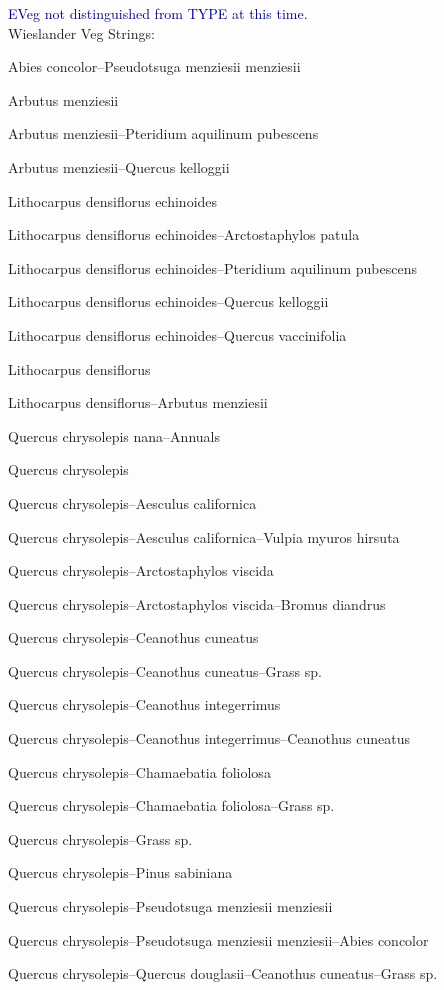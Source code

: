 \documentclass{article}
\newcommand{\mcomment}[1]{\textcolor{navy}{#1}}
\begin{document}
\mcomment{EVeg not distinguished from TYPE at this time.}\\
Wieslander Veg Strings:
\par	Abies concolor--Pseudotsuga menziesii menziesii
\par	Arbutus menziesii
\par	Arbutus menziesii--Pteridium aquilinum pubescens
\par	Arbutus menziesii--Quercus kelloggii
\par	Lithocarpus densiflorus echinoides
\par	Lithocarpus densiflorus echinoides--Arctostaphylos patula
\par	Lithocarpus densiflorus echinoides--Pteridium aquilinum pubescens
\par	Lithocarpus densiflorus echinoides--Quercus kelloggii
\par	Lithocarpus densiflorus echinoides--Quercus vaccinifolia
\par	Lithocarpus densiflorus
\par	Lithocarpus densiflorus--Arbutus menziesii
\par	Quercus chrysolepis nana--Annuals
\par	Quercus chrysolepis
\par	Quercus chrysolepis--Aesculus californica
\par	Quercus chrysolepis--Aesculus californica--Vulpia myuros hirsuta
\par	Quercus chrysolepis--Arctostaphylos viscida
\par	Quercus chrysolepis--Arctostaphylos viscida--Bromus diandrus
\par	Quercus chrysolepis--Ceanothus cuneatus
\par	Quercus chrysolepis--Ceanothus cuneatus--Grass sp.
\par	Quercus chrysolepis--Ceanothus integerrimus
\par	Quercus chrysolepis--Ceanothus integerrimus--Ceanothus cuneatus
\par	Quercus chrysolepis--Chamaebatia foliolosa
\par	Quercus chrysolepis--Chamaebatia foliolosa--Grass sp.
\par	Quercus chrysolepis--Grass sp.
\par	Quercus chrysolepis--Pinus sabiniana
\par	Quercus chrysolepis--Pseudotsuga menziesii menziesii
\par	Quercus chrysolepis--Pseudotsuga menziesii menziesii--Abies concolor
\par	Quercus chrysolepis--Quercus douglasii--Ceanothus cuneatus--Grass sp.
\end{document}

